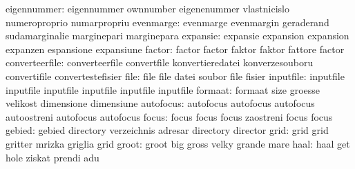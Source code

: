               eigennummer: eigennummer               ownnumber
                           eigenenummer              vlastnicislo
                           numeroproprio             numarpropriu
                evenmarge: evenmarge                 evenmargin
                           geraderand                sudamarginalie
                           marginepari               marginepara
                 expansie: expansie                  expansion
                           expansion                 expanzen
                           espansione                expansiune
                   factor: factor                    factor
                           faktor                    faktor
                           fattore                   factor
           converteerfile: converteerfile            convertfile
                           konvertieredatei          konverzesouboru
                           convertifile              convertestefisier
                     file: file                      file
                           datei                     soubor
                           file                      fisier
                inputfile: inputfile                 inputfile
                           inputfile                 inputfile
                           inputfile                 inputfile %
                  formaat: formaat                   size
                           groesse                   velikost
                           dimensione                dimensiune
                autofocus: autofocus                 autofocus
                           autofocus                 autoostreni
                           autofocus                 autofocus
                    focus: focus                     focus
                           focus                     zaostreni
                           focus                     focus %
                   gebied: gebied                    directory
                           verzeichnis               adresar
                           directory                 director
                     grid: grid                      grid
                           gritter                   mrizka
                           griglia                   grid
                    groot: groot                     big
                           gross                     velky
                           grande                    mare
                     haal: haal                      get
                           hole                      ziskat
                           prendi                    adu
